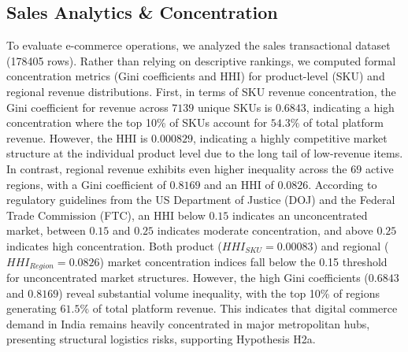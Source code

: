 \documentclass[authoryear,review,3p,times,12pt]{elsarticle}
\begin{document}
\subsection{Sales Analytics \& Concentration}
To evaluate e-commerce operations, we analyzed the sales transactional dataset (178405 rows). Rather than relying on descriptive rankings, we computed formal concentration metrics (Gini coefficients and HHI) for product-level (SKU) and regional revenue distributions.
First, in terms of SKU revenue concentration, the Gini coefficient for revenue across $7139$ unique SKUs is $0.6843$, indicating a high concentration where the top 10\% of SKUs account for $54.3\%$ of total platform revenue. However, the HHI is $0.000829$, indicating a highly competitive market structure at the individual product level due to the long tail of low-revenue items. In contrast, regional revenue exhibits even higher inequality across the $69$ active regions, with a Gini coefficient of $0.8169$ and an HHI of $0.0826$. According to regulatory guidelines from the US Department of Justice (DOJ) and the Federal Trade Commission (FTC), an HHI below $0.15$ indicates an unconcentrated market, between $0.15$ and $0.25$ indicates moderate concentration, and above $0.25$ indicates high concentration. Both product ($HHI_{SKU} = 0.00083$) and regional ($HHI_{Region} = 0.0826$) market concentration indices fall below the 0.15 threshold for unconcentrated market structures. However, the high Gini coefficients ($0.6843$ and $0.8169$) reveal substantial volume inequality, with the top 10\% of regions generating $61.5\%$ of total platform revenue. This indicates that digital commerce demand in India remains heavily concentrated in major metropolitan hubs, presenting structural logistics risks, supporting Hypothesis H2a.
\end{document}
